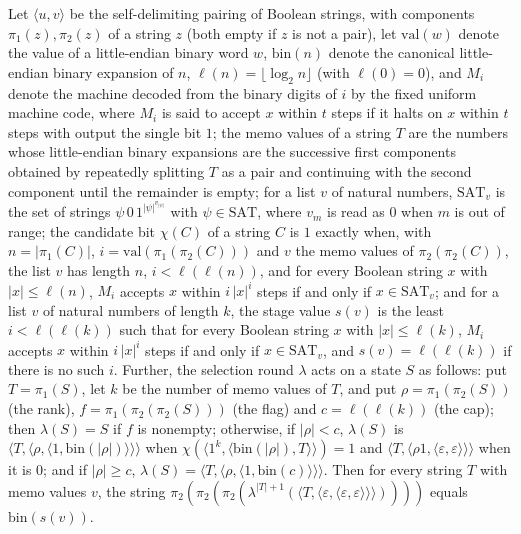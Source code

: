\begin{theorem}
\label{Complexity.ladner_select_readout}
\leanok
{}
Let $\langle u,v\rangle$ be the self-delimiting pairing of Boolean strings, with components $\pi_1(z),\pi_2(z)$ of a string $z$ (both empty if $z$ is not a pair), let $\mathrm{val}(w)$ denote the value of a little-endian binary word $w$, $\mathrm{bin}(n)$ denote the canonical little-endian binary expansion of $n$, $\ell(n)=\lfloor\log_2 n\rfloor$ (with $\ell(0)=0$), and $M_i$ denote the machine decoded from the binary digits of $i$ by the fixed uniform machine code, where $M_i$ is said to accept $x$ within $t$ steps if it halts on $x$ within $t$ steps with output the single bit $1$; the memo values of a string $T$ are the numbers whose little-endian binary expansions are the successive first components obtained by repeatedly splitting $T$ as a pair and continuing with the second component until the remainder is empty; for a list $v$ of natural numbers, $\mathrm{SAT}_v$ is the set of strings $\psi\,0\,1^{|\psi|^{v_{|\psi|}}}$ with $\psi\in\mathrm{SAT}$, where $v_m$ is read as $0$ when $m$ is out of range; the candidate bit $\chi(C)$ of a string $C$ is $1$ exactly when, with $n=|\pi_1(C)|$, $i=\mathrm{val}(\pi_1(\pi_2(C)))$ and $v$ the memo values of $\pi_2(\pi_2(C))$, the list $v$ has length $n$, $i<\ell(\ell(n))$, and for every Boolean string $x$ with $|x|\le\ell(n)$, $M_i$ accepts $x$ within $i\,|x|^i$ steps if and only if $x\in\mathrm{SAT}_v$; and for a list $v$ of natural numbers of length $k$, the stage value $s(v)$ is the least $i<\ell(\ell(k))$ such that for every Boolean string $x$ with $|x|\le\ell(k)$, $M_i$ accepts $x$ within $i\,|x|^i$ steps if and only if $x\in\mathrm{SAT}_v$, and $s(v)=\ell(\ell(k))$ if there is no such $i$. Further, the selection round $\lambda$ acts on a state $S$ as follows: put $T=\pi_1(S)$, let $k$ be the number of memo values of $T$, and put $\rho=\pi_1(\pi_2(S))$ (the rank), $f=\pi_1(\pi_2(\pi_2(S)))$ (the flag) and $c=\ell(\ell(k))$ (the cap); then $\lambda(S)=S$ if $f$ is nonempty; otherwise, if $|\rho|<c$, $\lambda(S)$ is $\langle T,\langle\rho,\langle 1,\mathrm{bin}(|\rho|)\rangle\rangle\rangle$ when $\chi(\langle 1^{k},\langle\mathrm{bin}(|\rho|),T\rangle\rangle)=1$ and $\langle T,\langle\rho1,\langle\varepsilon,\varepsilon\rangle\rangle\rangle$ when it is $0$; and if $|\rho|\ge c$, $\lambda(S)=\langle T,\langle\rho,\langle 1,\mathrm{bin}(c)\rangle\rangle\rangle$.
Then for every string $T$ with memo values $v$, the string
$\pi_2(\pi_2(\pi_2(\lambda^{|T|+1}(\langle T,\langle\varepsilon,\langle\varepsilon,\varepsilon\rangle\rangle\rangle))))$
equals $\mathrm{bin}(s(v))$.
\end{theorem}

